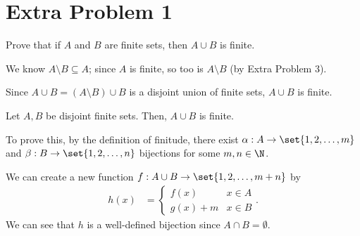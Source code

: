 \documentclass[11pt]{mypackage}
\begin{document}
\section{Extra Problem 1}%
\begin{problem}
  Prove that if $A$ and $B$ are finite sets, then $A\cup B$ is finite.
\end{problem}

  \begin{solution}
    We know $A\setminus B \subseteq A$; since $A$ is finite, so too is $A\setminus B$ (by Extra Problem 3).\newline

    Since $A\cup B = \left(A\setminus B\right)\cup B$ is a disjoint union of finite sets, $A\cup B$ is finite.
  \end{solution}
\begin{remark}
  Let $A,B$ be disjoint finite sets. Then, $A\cup B$ is finite.\newline

  To prove this, by the definition of finitude, there exist $\alpha: A\rightarrow \set{1,2,\dots,m}$ and $\beta: B\rightarrow \set{1,2,\dots,n}$ bijections for some $m,n\in \N$.\newline

  We can create a new function $f: A\cup B \rightarrow \set{1,2,\dots,m+n}$ by 
  \begin{align*}
    h(x) &= \begin{cases}
      f(x) & x\in A\\
      g(x) + m & x\in B
    \end{cases}.
  \end{align*}
  We can see that $h$ is a well-defined bijection since $A\cap B = \emptyset$.
\end{remark}

\end{document}
